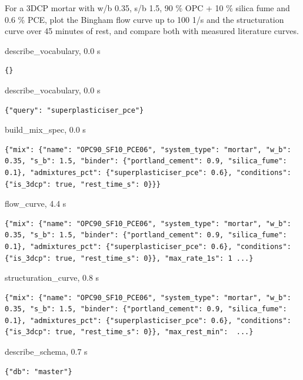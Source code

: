 \begin{userbox}
For a 3DCP mortar with w/b 0.35, s/b 1.5, 90 \% OPC + 10 \% silica fume and 0.6 \% PCE, plot the Bingham flow curve up to 100 1/s and the structuration curve over 45 minutes of rest, and compare both with measured literature curves.
\end{userbox}
\begin{toolbox}{describe\_vocabulary, 0.0 s}
\begin{lstlisting}[style=argstyle]
{}
\end{lstlisting}
\end{toolbox}
\begin{toolbox}{describe\_vocabulary, 0.0 s}
\begin{lstlisting}[style=argstyle]
{"query": "superplasticiser_pce"}
\end{lstlisting}
\end{toolbox}
\begin{toolbox}{build\_mix\_spec, 0.0 s}
\begin{lstlisting}[style=argstyle]
{"mix": {"name": "OPC90_SF10_PCE06", "system_type": "mortar", "w_b": 0.35, "s_b": 1.5, "binder": {"portland_cement": 0.9, "silica_fume": 0.1}, "admixtures_pct": {"superplasticiser_pce": 0.6}, "conditions": {"is_3dcp": true, "rest_time_s": 0}}}
\end{lstlisting}
\end{toolbox}
\begin{toolbox}{flow\_curve, 4.4 s}
\begin{lstlisting}[style=argstyle]
{"mix": {"name": "OPC90_SF10_PCE06", "system_type": "mortar", "w_b": 0.35, "s_b": 1.5, "binder": {"portland_cement": 0.9, "silica_fume": 0.1}, "admixtures_pct": {"superplasticiser_pce": 0.6}, "conditions": {"is_3dcp": true, "rest_time_s": 0}}, "max_rate_1s": 1 ...}
\end{lstlisting}
\end{toolbox}
\begin{toolbox}{structuration\_curve, 0.8 s}
\begin{lstlisting}[style=argstyle]
{"mix": {"name": "OPC90_SF10_PCE06", "system_type": "mortar", "w_b": 0.35, "s_b": 1.5, "binder": {"portland_cement": 0.9, "silica_fume": 0.1}, "admixtures_pct": {"superplasticiser_pce": 0.6}, "conditions": {"is_3dcp": true, "rest_time_s": 0}}, "max_rest_min":  ...}
\end{lstlisting}
\end{toolbox}
\begin{toolbox}{describe\_schema, 0.7 s}
\begin{lstlisting}[style=argstyle]
{"db": "master"}
\end{lstlisting}
\end{toolbox}
